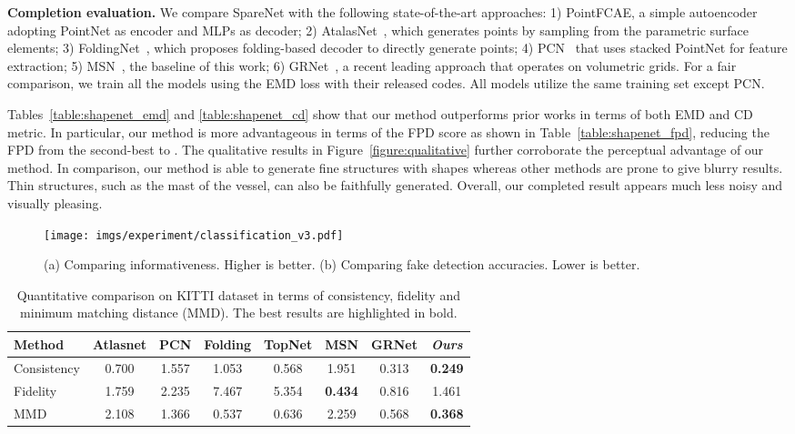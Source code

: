 \documentclass[final]{cvpr}
\begin{document}
\noindent\textbf{Completion evaluation.}
We compare SpareNet with the following state-of-the-art approaches: 1) PointFCAE, a simple autoencoder adopting PointNet as encoder and MLPs as decoder; 2) AtalasNet~\cite{atlasnet2018}, which generates points by sampling from the parametric surface elements; 3) FoldingNet~\cite{foldingnet_2018_CVPR}, which proposes folding-based decoder to directly generate points;  4) PCN~\cite{Yuan-2018-pcn} that uses stacked PointNet for feature extraction; 5) MSN~\cite{liu2019morphing}, the baseline of this work; 6) GRNet~\cite{xie2020grnet}, a recent leading approach that operates on volumetric grids. For a fair comparison, we train all the models using the EMD loss with their released codes. All models utilize the same training set except PCN. 

Tables~\ref{table:shapenet_emd} and \ref{table:shapenet_cd} show that our method outperforms prior works in terms of both EMD and CD metric. In particular, our method is more advantageous in terms of the FPD score as shown in Table~\ref{table:shapenet_fpd}, reducing the FPD from the second-best  to . The qualitative results in Figure~\ref{figure:qualitative} further corroborate the perceptual advantage of our method. In comparison, our method is able to generate fine structures with shapes whereas other methods are prone to give blurry results. Thin structures, such as the mast of the vessel, can also be faithfully generated. Overall, our completed result appears much less noisy and visually pleasing.


\begin{figure}[t]
\centering
 \texttt{[image: imgs/experiment/classification\_v3.pdf]}
 \footnotesize
\caption{(a) Comparing informativeness. Higher is better. (b) Comparing fake detection accuracies. Lower is better. }
\label{fig:pointnet_classification}
\vspace{-1em}
\end{figure}

\begin{table}
\begin{center}
\footnotesize
\setlength\tabcolsep{3pt}
\begin{tabular}{@{}l|ccccccc@{}}
\toprule
Method&Atlasnet&PCN&Folding&TopNet&MSN&GRNet&\emph{Ours}\\

\midrule
Consistency & 0.700 & 1.557 & 1.053 & 0.568 & 1.951 & 0.313 & \textbf{0.249}\\
Fidelity & 1.759 & 2.235 & 7.467 & 5.354 & \textbf{0.434} & 0.816 & 1.461\\
MMD & 2.108 & 1.366 & 0.537 & 0.636 & 2.259 & 0.568 & \textbf{0.368}\\
\bottomrule
\end{tabular}
\end{center}
\caption{Quantitative comparison on KITTI dataset in terms of consistency, fidelity and minimum matching distance (MMD). The best results are highlighted in bold.
\label{table:kitti}
}
\vspace{-1em}
\end{table}
\end{document}
